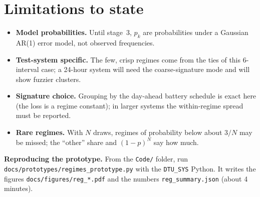 \documentclass[10pt,a4paper]{article}
\newcommand{\code}[1]{\texttt{#1}}
\begin{document}
\section{Limitations to state}
\begin{itemize}
  \item \textbf{Model probabilities.} Until stage~3, $p_k$ are probabilities under a Gaussian AR(1) error model,
    not observed frequencies.
  \item \textbf{Test-system specific.} The few, crisp regimes come from the ties of this 6-interval case;
    a 24-hour system will need the coarse-signature mode and will show fuzzier clusters.
  \item \textbf{Signature choice.} Grouping by the day-ahead battery schedule is exact here (the loss is a
    regime constant); in larger systems the within-regime spread must be reported.
  \item \textbf{Rare regimes.} With $N$ draws, regimes of probability below about $3/N$ may be missed; the
    ``other'' share and $(1-p)^N$ say how much.
\end{itemize}

{\small\textbf{Reproducing the prototype.} From the \code{Code/} folder, run
\code{docs/prototypes/regimes\_prototype.py} with the \code{DTU\_SYS} Python. It writes the figures
\code{docs/figures/reg\_*.pdf} and the numbers \code{reg\_summary.json} (about 4 minutes).}
\end{document}
